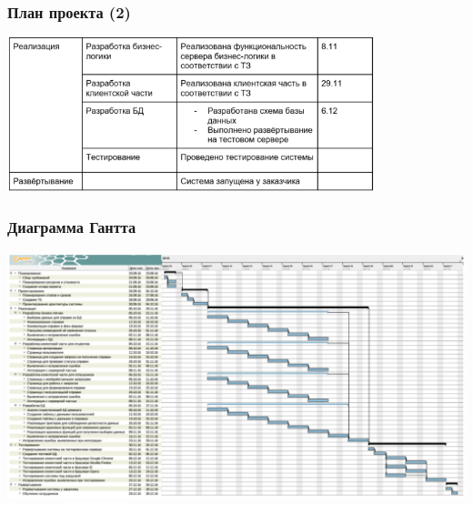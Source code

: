 \documentclass{../../slides-style}
\begin{document}
    \begin{frame}
        \frametitle{План проекта (2)}
        \begin{center}
            \includegraphics[width=0.8\textwidth]{plan2.png}
        \end{center}
    \end{frame}

    \begin{frame}
        \frametitle{Диаграмма Гантта}
        \begin{center}
            \includegraphics[width=\textwidth]{ganttChart.png}
        \end{center}
    \end{frame}
\end{document}
